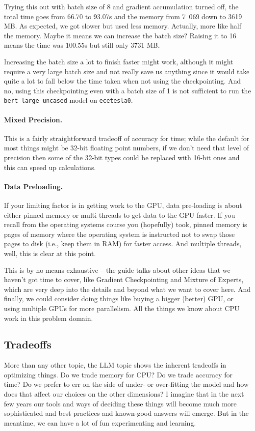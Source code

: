 Trying this out with batch size of 8 and gradient accumulation turned off, the total time goes from 66.70 to 93.07s and the memory from 7~069 down to 3619 MB. As expected, we got slower but used less memory. Actually, more like half the memory. Maybe it means we can increase the batch size? Raising it to 16 means the time was  100.55s but still only 3731 MB.

Increasing the batch size a lot to finish faster might work, although it might require a very large batch size and not really save us anything since it would take quite a lot to fall below the time taken when not using the checkpointing. And no, using this checkpointing even with a batch size of 1 is not sufficient to run the \texttt{bert-large-uncased} model on \texttt{ecetesla0}. 

\paragraph{Mixed Precision.} This is a fairly straightforward tradeoff of accuracy for time; while the default for most things might be 32-bit floating point numbers, if we don't need that level of precision then some of the 32-bit types could be replaced with 16-bit ones and this can speed up calculations. 

\paragraph{Data Preloading.} If your limiting factor is in getting work to the GPU, data pre-loading is about either pinned memory or multi-threads to get data to the GPU faster. If you recall from the operating systems course you (hopefully) took, pinned memory is pages of memory where the operating system is instructed not to swap those pages to disk (i.e., keep them in RAM) for faster access. And multiple threads, well, this is clear at this point. 

This is by no means exhaustive -- the guide talks about other ideas that we haven't got time to cover, like Gradient Checkpointing and Mixture of Experts, which are very deep into the details and beyond what we want to cover here. And finally, we could consider doing things like buying a bigger (better) GPU, or using multiple GPUs for more parallelism. All the things we know about CPU work in this problem domain. 

\subsection*{Tradeoffs}

More than any other topic, the LLM topic shows the inherent tradeoffs in optimizing things. Do we trade memory for CPU? Do we trade accuracy for time? Do we prefer to err on the side of under- or over-fitting the model and how does that affect our choices on the other dimensions? I imagine that in the next few years our tools and ways of deciding these things will become much more sophisticated and best practices and known-good answers will emerge. But in the meantime, we can have a lot of fun experimenting and learning.




